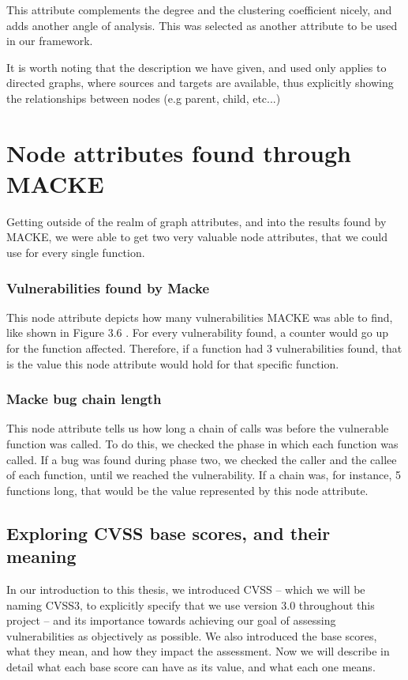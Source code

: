 This attribute complements the degree and the clustering coefficient nicely, and adds another angle of analysis. This was selected as another attribute to be used in our framework.

It is worth noting that the description we have given, and used only applies to directed graphs, where sources and targets are available, thus explicitly showing the relationships between nodes (e.g parent, child, etc...)

\section{Node attributes found through MACKE}

Getting outside of the realm of graph attributes, and into the results found by MACKE, we were able to get two very valuable node attributes, that we could use for every single function.

\subsubsection{Vulnerabilities found by Macke}

This node attribute depicts how many vulnerabilities MACKE was able to find, like shown in Figure 3.6 . For every vulnerability found, a counter would go up for the function affected. Therefore, if a function had 3 vulnerabilities found, that is the value this node attribute would hold for that specific function.

\subsubsection{Macke bug chain length}

This node attribute tells us how long a chain of calls was before the vulnerable function was called. To do this, we checked the phase in which each function was called. If a bug was found during phase two, we checked the caller and the callee of each function, until we reached the vulnerability. If a chain was, for instance, 5 functions long, that would be the value represented by this node attribute.

\subsection{Exploring CVSS base scores, and their meaning}

In our introduction to this thesis, we introduced CVSS -- which we will be naming CVSS3, to explicitly specify that we use version 3.0 throughout this project -- and its importance towards achieving our goal of assessing vulnerabilities as objectively as possible. We also introduced the base scores, what they mean, and how they impact the assessment. Now we will describe in detail what each base score can have as its value, and what each one means.

